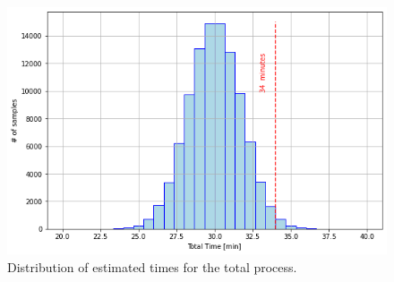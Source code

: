 \begin{solution}
\begin{figure}[htbp]
	\begin{center}
		\includegraphics[width=0.7\linewidth]{figures/mc_processes}
	\end{center}
	\caption{Distribution of estimated times for the total process.}
	\label{fig:mc_processes}
\end{figure}
\end{solution}

